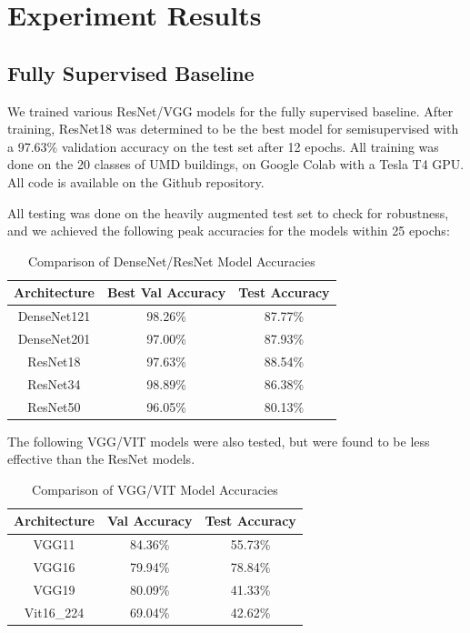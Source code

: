 \documentclass{article}
\begin{document}
\section{Experiment Results}
\label{result}

\subsection{Fully Supervised Baseline}

We trained various ResNet/VGG models for the fully supervised baseline. After training, ResNet18 was determined to be the best model for semisupervised with a 97.63\% validation accuracy on the test set after 12 epochs. All training was done on the 20 classes of UMD buildings, on Google Colab with a Tesla T4 GPU. All code is available on the Github repository.

All testing was done on the heavily augmented test set to check for robustness, and we achieved the following peak accuracies for the models within 25 epochs:

\begin{table}[H]
    \centering
    \begin{tabular}{|c|c|c|}
        \hline
        Architecture & Best Val Accuracy & Test Accuracy \\
        \hline
        DenseNet121 & 98.26\% & 87.77\% \\
        \hline
        DenseNet201 & 97.00\% & 87.93\% \\
        \hline
        ResNet18 & 97.63\% & 88.54\% \\
        \hline
        ResNet34 & 98.89\% & 86.38\% \\
        \hline
        ResNet50 & 96.05\% & 80.13\% \\
        \hline
    \end{tabular}
    \caption{Comparison of DenseNet/ResNet Model Accuracies}
    \label{tab:dnrn_model_accuracies}
\end{table}

The following VGG/VIT models were also tested, but were found to be less effective than the ResNet models.

\begin{table}[H]
    \centering
    \begin{tabular}{|c|c|c|}
        \hline
        Architecture & Val Accuracy & Test Accuracy \\
        \hline
        VGG11 & 84.36\% & 55.73\% \\
        \hline
        VGG16 & 79.94\% & 78.84\% \\
        \hline
        VGG19 & 80.09\% & 41.33\% \\
        \hline
        Vit16\_224 & 69.04\% & 42.62\% \\
        \hline
    \end{tabular}
    \caption{Comparison of VGG/VIT Model Accuracies}
    \label{tab:vgg_model_accuracies}
\end{table}
\end{document}
